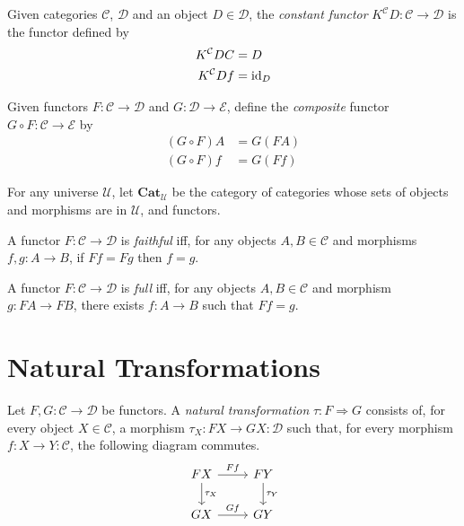 \begin{df}
    Given categories $\mathcal{C}$, $\mathcal{D}$ and an object $D \in \mathcal{D}$, the \emph{constant functor} $K^\mathcal{C} D : \mathcal{C} \rightarrow \mathcal{D}$ is the functor defined by
    \begin{align*}
        K^\mathcal{C} D C & = D      \\
        K^\mathcal{C} D f & = \mathrm{id}_{D}
    \end{align*}
\end{df}

\begin{df}
Given functors $F : \mathcal{C} \rightarrow \mathcal{D}$ and $G : \mathcal{D} \rightarrow \mathcal{E}$, define the \emph{composite} functor $G \circ F : \mathcal{C} \rightarrow \mathcal{E}$ by
\begin{align*}
(G \circ F) A & = G (F A) \\
(G \circ F) f & = G (F f)
\end{align*}
\end{df}

\begin{df}
For any universe $\mathcal{U}$, let $\mathbf{Cat}_\mathcal{U}$ be the category of categories whose sets of objects and morphisms are in $\mathcal{U}$, and functors.
\end{df}

\begin{df}[Faithful]
A functor $F : \mathcal{C} \rightarrow \mathcal{D}$ is \emph{faithful} iff, for any objects $A,B \in \mathcal{C}$ and morphisms $f,g : A \rightarrow B$, if $Ff = Fg$ then $f = g$.
\end{df}

\begin{df}[Full]
A functor $F : \mathcal{C} \rightarrow \mathcal{D}$ is \emph{full} iff, for any objects $A, B \in \mathcal{C}$ and morphism $g : FA \rightarrow FB$, there exists $f : A \rightarrow B$ such that $Ff = g$.
\end{df}

\chapter{Natural Transformations}

\begin{df}
Let $F,G : \mathcal{C} \rightarrow \mathcal{D}$ be functors. A \emph{natural transformation} $\tau : F \Rightarrow G$ consists of, for every object $X \in \mathcal{C}$, a morphism $\tau_X : F X \rightarrow G X : \mathcal{D}$ such that, for every morphism $f : X \rightarrow Y : \mathcal{C}$, the following diagram commutes.
\[ \begin{tikzcd}
FX \arrow[r,"Ff"] \arrow[d,"\tau_X"] & FY \arrow[d,"\tau_Y"] \\
GX \arrow[r,"Gf"] & GY
\end{tikzcd} \]
\end{df}


